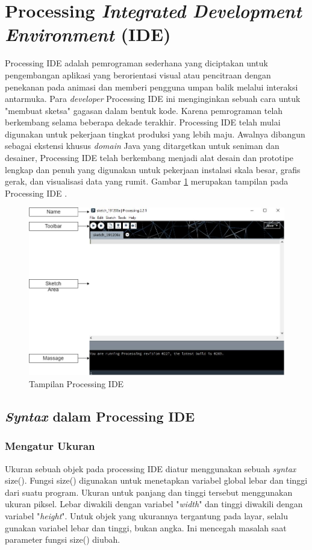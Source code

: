 \section{Processing \textit{Integrated Development Environment} (IDE)}
Processing IDE adalah pemrograman sederhana yang diciptakan untuk pengembangan aplikasi yang berorientasi visual atau pencitraan dengan penekanan pada animasi dan memberi pengguna umpan balik melalui interaksi antarmuka. Para \textit{developer} Processing IDE ini menginginkan sebuah cara untuk "membuat sketsa" gagasan dalam bentuk kode. Karena pemrograman telah berkembang selama beberapa dekade terakhir. Processing IDE telah mulai digunakan untuk pekerjaan tingkat produksi yang lebih maju. Awalnya dibangun sebagai ekstensi khusus \textit{domain} Java yang ditargetkan untuk seniman dan desainer, Processing IDE telah berkembang menjadi alat desain dan prototipe lengkap dan penuh yang digunakan untuk pekerjaan instalasi skala besar, grafis gerak, dan visualisasi data yang rumit. Gambar \ref{pic.processingide} merupakan tampilan pada Processing IDE \cite{aku2012} .
	\begin{figure}[H]
	\centering
	\includegraphics[width=12cm]{gambar/processing_view.png}
	\caption{Tampilan Processing IDE}
	\label{pic.processingide}
	\end{figure}


\subsection{\textit{Syntax} dalam Processing IDE }

\subsubsection{Mengatur Ukuran}
Ukuran sebuah objek pada processing IDE diatur menggunakan sebuah \textit{syntax} size(). Fungsi size() digunakan untuk menetapkan variabel global lebar dan tinggi dari suatu program. Ukuran untuk panjang dan tinggi tersebut menggunakan ukuran piksel. Lebar diwakili dengan variabel "\textit{width}" dan tinggi diwakili dengan variabel "\textit{height}". Untuk objek yang ukurannya tergantung pada layar, selalu gunakan variabel lebar dan tinggi, bukan angka. Ini mencegah masalah saat parameter fungsi size() diubah.


